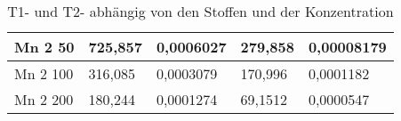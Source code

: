 \begin{table}[H]
\begin{tabular}{lllll}
    \multicolumn{1}{|l|}{Mn 2 50}     & \multicolumn{1}{l|}{725,857} & \multicolumn{1}{l|}{0,0006027} & \multicolumn{1}{l|}{279,858} & \multicolumn{1}{l|}{0,00008179} \\ \hline
    \multicolumn{1}{|l|}{Mn 2 100}    & \multicolumn{1}{l|}{316,085} & \multicolumn{1}{l|}{0,0003079} & \multicolumn{1}{l|}{170,996} & \multicolumn{1}{l|}{0,0001182}  \\ \hline
    \multicolumn{1}{|l|}{Mn 2 200}    & \multicolumn{1}{l|}{180,244} & \multicolumn{1}{l|}{0,0001274} & \multicolumn{1}{l|}{69,1512} & \multicolumn{1}{l|}{0,0000547}  \\ \hline
    \end{tabular}
    \caption{T1- und T2- abhängig von den Stoffen und der Konzentration}
    \end{table}
